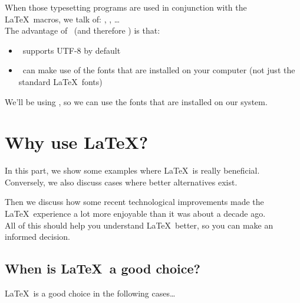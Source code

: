 When those typesetting programs are used in conjunction with the \LaTeX\ macros, we talk of:  \pdfLaTeX, \XeLaTeX, \LuaLaTeX\dots \\

The advantage of \XeTeX\ (and therefore \XeLaTeX) is that:
\begin{itemize}
	\item \XeTeX\ supports UTF-8 by default
	\item \XeTeX\ can make use of the fonts that are installed on your computer (not just the standard \LaTeX\ fonts)
\end{itemize}

We'll be using \XeLaTeX, so we can use the fonts that are installed on our system. \\




\section{Why use \LaTeX?}

In this part, we show some examples where \LaTeX\ is really beneficial. Conversely, we also discuss cases where better alternatives exist.

Then we discuss how some recent technological improvements made the \LaTeX\ experience a lot more enjoyable than it was about a decade ago. \\

All of this should help you understand \LaTeX\ better, so you can make an informed decision.


\subsection{When is \LaTeX\ a good choice?}

\LaTeX\ is a good choice in the following cases\dots

